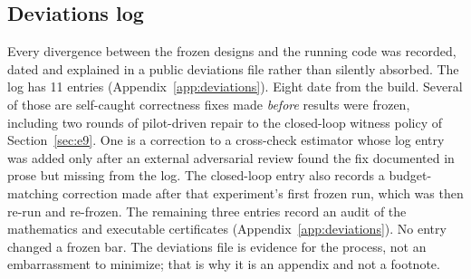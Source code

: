 \subsection{Deviations log}
\label{sec:methods-deviations}

Every divergence between the frozen designs and the running code was recorded, dated and explained in a public deviations file rather than silently absorbed. The log has 11 entries (Appendix~\ref{app:deviations}). %
Eight date from the build. Several of those are self-caught correctness fixes made \emph{before} results were frozen, including two rounds of pilot-driven repair to the closed-loop witness policy of Section~\ref{sec:e9}. One is a correction to a cross-check estimator whose log entry was added only after an external adversarial review found the fix documented in prose but missing from the log. The closed-loop entry also records a budget-matching correction made after that experiment's first frozen run, which was then re-run and re-frozen. The remaining three entries record an audit of the mathematics and executable certificates (Appendix~\ref{app:deviations}). No entry changed a frozen bar. %
The deviations file is evidence for the process, not an embarrassment to minimize; that is why it is an appendix and not a footnote. %
